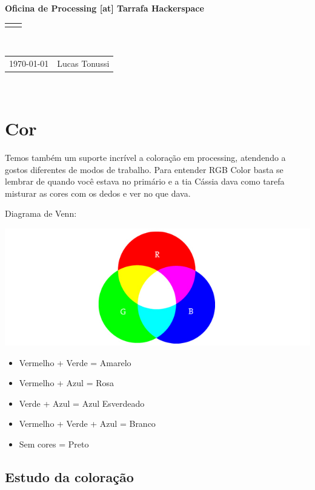 \documentclass[12pt]{article}
\renewcommand{\title}[1]{\textbf{#1}\\}
\renewcommand{\line}{\begin{tabularx}{\textwidth}{X>{\raggedleft}X}\hline\\\end{tabularx}\\[-0.5cm]}
\newcommand{\leftright}[2]{\begin{tabularx}{\textwidth}{X>{\raggedleft}X}#1%
& #2\\\end{tabularx}\\[-0.5cm]}
\begin{document}
\title{Oficina de Processing [at] Tarrafa Hackerspace}
\line
\leftright{\today}{Lucas Tonussi}

\section{Cor}

\qquad Temos também um suporte incrível a coloração em processing, atendendo a gostos diferentes de modos de trabalho. Para entender RGB Color basta se lembrar de quando você estava no primário e a tia Cássia dava como tarefa misturar as cores com os dedos e ver no que dava.

\qquad Diagrama de Venn:
\begin{center}
\includegraphics[scale=0.45]{rgb}
\end{center}

\begin{itemize}
\item Vermelho + Verde = Amarelo
\item Vermelho + Azul = Rosa
\item Verde + Azul = Azul Esverdeado
\item Vermelho + Verde + Azul = Branco
\item Sem cores = Preto
\end{itemize}

\subsection{Estudo da coloração}

\qquad
\end{document}
